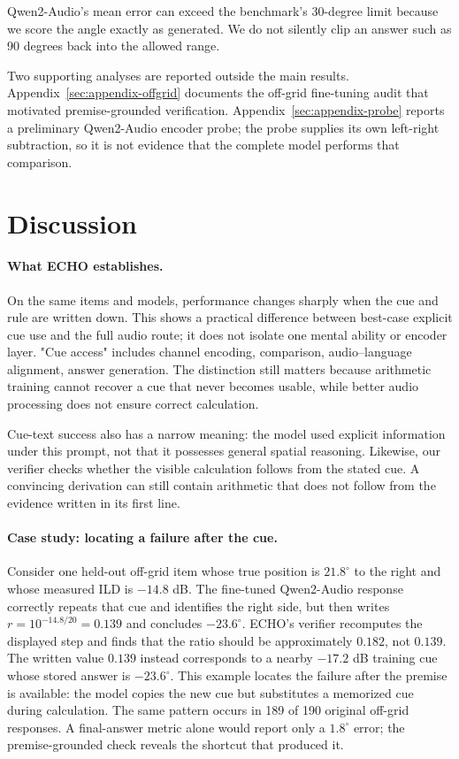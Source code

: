 \documentclass{article}
\begin{document}
Qwen2-Audio's mean error can exceed the benchmark's 30-degree limit because we score the angle exactly as generated. We do not silently clip an answer such as 90 degrees back into the allowed range.

Two supporting analyses are reported outside the main results. Appendix~\ref{sec:appendix-offgrid} documents the off-grid fine-tuning audit that motivated premise-grounded verification. Appendix~\ref{sec:appendix-probe} reports a preliminary Qwen2-Audio encoder probe; the probe supplies its own left-right subtraction, so it is not evidence that the complete model performs that comparison.

\section{Discussion}
\label{sec:discussion}

\paragraph{What ECHO establishes.} On the same items and models, performance changes sharply when the cue and rule are written down. This shows a practical difference between best-case explicit cue use and the full audio route; it does not isolate one mental ability or encoder layer. "Cue access" includes channel encoding, comparison, audio--language alignment, answer generation. The distinction still matters because arithmetic training cannot recover a cue that never becomes usable, while better audio processing does not ensure correct calculation.

Cue-text success also has a narrow meaning: the model used explicit information under this prompt, not that it possesses general spatial reasoning. Likewise, our verifier checks whether the visible calculation follows from the stated cue. A convincing derivation can still contain arithmetic that does not follow from the evidence written in its first line.

\paragraph{Case study: locating a failure after the cue.} Consider one held-out off-grid item whose true position is \(21.8^\circ\) to the right and whose measured ILD is \(-14.8\) dB. The fine-tuned Qwen2-Audio response correctly repeats that cue and identifies the right side, but then writes \(r=10^{-14.8/20}=0.139\) and concludes \(-23.6^\circ\). ECHO's verifier recomputes the displayed step and finds that the ratio should be approximately \(0.182\), not \(0.139\). The written value \(0.139\) instead corresponds to a nearby \(-17.2\) dB training cue whose stored answer is \(-23.6^\circ\). This example locates the failure after the premise is available: the model copies the new cue but substitutes a memorized cue during calculation. The same pattern occurs in 189 of 190 original off-grid responses. A final-answer metric alone would report only a \(1.8^\circ\) error; the premise-grounded check reveals the shortcut that produced it.
\end{document}
